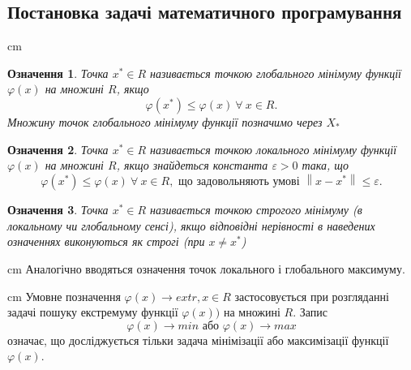 \documentclass[12pt,a4paper]{article}
\begin{document}
	\begin{center}
		\section*{Постановка задачі математичного програмування}
	\end{center}
\begin{flushleft}
\parbox{14,5 cm}{ cm  \newtheorem{law}{Означення}\newtheorem{law1}[law]{Означення}\newtheorem{law2}[law]{Означення} \newtheorem{law3}[law]{Означення}\newtheorem{law4}[law]{Означення} \newtheorem{theorem}{Теорема}
\newtheorem{consequence}{Наслідок} \newtheorem{consequence1}[consequence]{Наслідок} \newtheorem{theorem1}[theorem]{Теорема} \newtheorem{law5}[law]{Означення} \newtheorem{theorem2}[theorem]{Теорема} \newtheorem{theorem3}[theorem]{Теорема}
\begin{law}
Точка ${x}^*\in R$ називається точкою глобального мінімуму функції $\varphi \left(x\right)$ на множині $R$, якщо 
\begin{displaymath}
\varphi \left({x}^*\right) \le \varphi \left(x\right) \ \forall \ x \in R. 
\end{displaymath}
 Множину точок глобального мінімуму функції позначимо через ${X}_*$ 
\end{law}
\begin{law1}
Точка ${x}^*\in R$ називається точкою локального мінімуму функції $\varphi \left(x\right)$ на множині $R$, якщо знайдеться константа $\varepsilon > 0$ така, що
\begin{displaymath}
\varphi \left({x}^*\right) \le \varphi \left(x\right) \ \forall \ x \in R, \text{ що задовольняють умові }\left \| x-{x}^*\right \| \le \varepsilon.
\end{displaymath}
\end{law1}
\begin{law2}
Точка ${x}^*\in R$ називається точкою строгого мінімуму (в локальному чи глобальному сенсі), якщо відповідні нерівності в наведених означеннях виконуються як строгі (при $x \neq {x}^*$)
\end{law2}}
\end{flushleft}
\begin{flushleft}
\parbox{14,5 cm}{ cm  Аналогічно вводяться означення точок локального і глобального максимуму.}
\end{flushleft}
\begin{flushleft}
\parbox{14,5 cm}{ cm  Умовне позначення $\varphi\left(x\right)\rightarrow extr, x\in R$ застосовується при розгляданні задачі пошуку екстремуму функції $\varphi\left(x\right))$ на множині $R$. Запис
\begin{displaymath}
\varphi\left(x\right)\rightarrow min \text{ або } \varphi\left(x\right)\rightarrow max
\end{displaymath}
означає, що досліджується тільки задача мінімізації або максимізації функції $\varphi\left(x\right)$.}
\end{flushleft}
\end{document}
